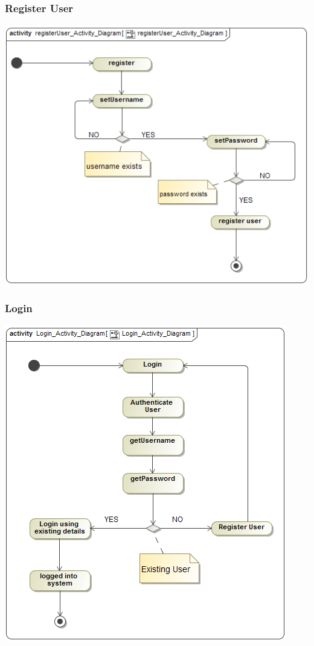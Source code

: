 \documentclass[11pt]{article}
\begin{document}
	\newpage
	\subsubsection{Register User}
	\begin{center}
		\includegraphics[width=\textwidth]{../Diagrams/ActivityDiagrams/registerUser_Activity_Diagram.png}\\[0.5cm]
	\end{center}

	\newpage
	\subsubsection{Login}
	\begin{center}
		\includegraphics[width=\textwidth]{../Diagrams/ActivityDiagrams/Login_Activity_Diagram.png}\\[0.5cm]
	\end{center}
	
\end{document}
